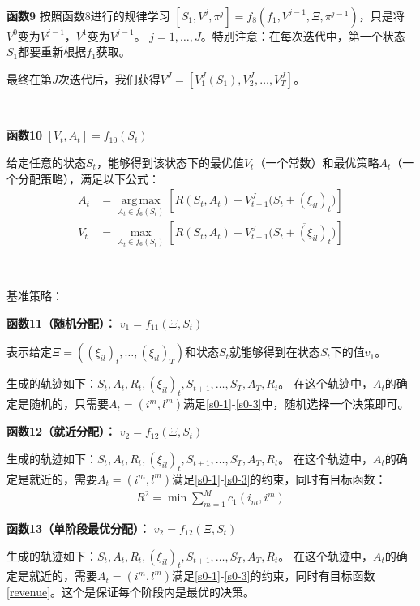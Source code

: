 \documentclass[a4paper,11pt]
{elsarticle}%
\newcommand{\nb}{\nonumber}
\begin{document}
~

\textbf{函数9 }
按照函数8进行的规律学习
$[S_1,V^{j},\pi^j]=f_8(f_1,V^{j-1},\Xi,\pi^{j-1})$，只是将$V^0$变为$V^{j-1}$，$V^1$变为$V^{j-1}$。
$j=1,\ldots,J$。特别注意：在每次迭代中，第一个状态$S_1$都要重新根据$f_1$获取。

最终在第$J$次迭代后，我们获得$V^J=[V_1^J(S_1),V_2^J
,\ldots,V_T^J]$。

~

\textbf{函数10 }
$[V_t,A_t]=f_{10}(S_t)$

给定任意的状态$S_t$，能够得到该状态下的最优值$V_t$（一个常数）和最优策略$A_t$（一个分配策略），满足以下公式：
\begin{align}\label{A2}
A_t&=\operatorname*{arg\,max}\limits_{A_t\in f_6(S_t)}[{R}({S}_t,{A}_t)+V^J_{t+1}(\overline{S_t+(\xi_{il})_t)}]\nb\\
V_t&=\max\limits_{A_t\in f_6(S_t)}[{R}({S}_t,{A}_t)+V^J_{t+1}(\overline{S_t+(\xi_{il})_t)}]
\end{align}


~

基准策略：

\textbf{函数11（随机分配）：}
$v_1=f_{11}(\Xi,S_t)$

表示给定$\Xi=((\xi_{il})_t,\ldots,(\xi_{il})_T)$和状态$S_t$就能够得到在状态$S_t$下的值$v_1$。

生成的轨迹如下：$S_t,A_t,R_t,(\xi_{il})_t,S_{t+1},\ldots,S_{T},A_{T},R_t$。
在这个轨迹中，$A_t$的确定是随机的，只需要$A_t=(i^m,l^m)$满足\eqref{s0-1}-\eqref{s0-3}中，随机选择一个决策即可。


\textbf{函数12（就近分配）：}
$v_2=f_{12}(\Xi,S_t)$

生成的轨迹如下：$S_t,A_t,R_t,(\xi_{il})_t,S_{t+1},\ldots,S_{T},A_{T},R_t$。
在这个轨迹中，$A_t$的确定是就近的，需要$A_t=(i^m,l^m)$满足\eqref{s0-1}-\eqref{s0-3}的约束，同时有目标函数：
\begin{align}
    R^2=\min\sum\limits_{m=1}^M c_1(i_m,i^m)
\end{align}


\textbf{函数13（单阶段最优分配）：}
$v_2=f_{12}(\Xi,S_t)$

生成的轨迹如下：$S_t,A_t,R_t,(\xi_{il})_t,S_{t+1},\ldots,S_{T},A_{T},R_t$。
在这个轨迹中，$A_t$的确定是就近的，需要$A_t=(i^m,l^m)$满足\eqref{s0-1}-\eqref{s0-3}的约束，同时有目标函数\eqref{revenue}。这个是保证每个阶段内是最优的决策。
\end{document}
